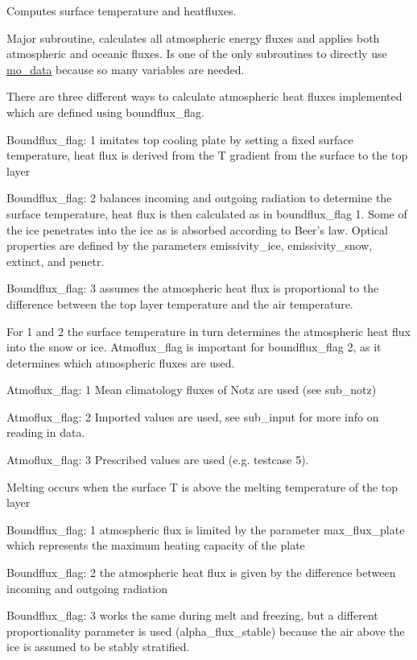 Computes surface temperature and heatfluxes. 

Major subroutine, calculates all atmospheric energy fluxes and applies both atmospheric and oceanic fluxes. Is one of the only subroutines to directly use \hyperlink{namespacemo__data}{mo\_\-data} because so many variables are needed.

There are three different ways to calculate atmospheric heat fluxes implemented which are defined using boundflux\_\-flag.


\begin{DoxyItemize}
\item Boundflux\_\-flag: 1 imitates top cooling plate by setting a fixed surface temperature, heat flux is derived from the T gradient from the surface to the top layer
\item Boundflux\_\-flag: 2 balances incoming and outgoing radiation to determine the surface temperature, heat flux is then calculated as in boundflux\_\-flag 1. Some of the ice penetrates into the ice as is absorbed according to Beer's law. Optical properties are defined by the parameters emissivity\_\-ice, emissivity\_\-snow, extinct, and penetr.
\item Boundflux\_\-flag: 3 assumes the atmospheric heat flux is proportional to the difference between the top layer temperature and the air temperature.
\end{DoxyItemize}

For 1 and 2 the surface temperature in turn determines the atmospheric heat flux into the snow or ice. Atmoflux\_\-flag is important for boundflux\_\-flag 2, as it determines which atmospheric fluxes are used.
\begin{DoxyItemize}
\item Atmoflux\_\-flag: 1 Mean climatology fluxes of Notz are used (see sub\_\-notz)
\item Atmoflux\_\-flag: 2 Imported values are used, see sub\_\-input for more info on reading in data.
\item Atmoflux\_\-flag: 3 Prescribed values are used (e.g. testcase 5).
\end{DoxyItemize}

Melting occurs when the surface T is above the melting temperature of the top layer
\begin{DoxyItemize}
\item Boundflux\_\-flag: 1 atmospheric flux is limited by the parameter max\_\-flux\_\-plate which represents the maximum heating capacity of the plate
\item Boundflux\_\-flag: 2 the atmospheric heat flux is given by the difference between incoming and outgoing radiation
\item Boundflux\_\-flag: 3 works the same during melt and freezing, but a different proportionality parameter is used (alpha\_\-flux\_\-stable) because the air above the ice is assumed to be stably stratified.
\end{DoxyItemize}

